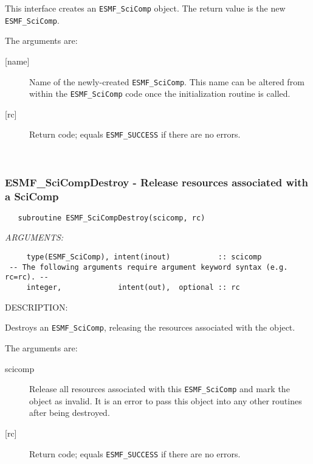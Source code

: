    This interface creates an {\tt ESMF\_SciComp} object. 
   The return value is the new {\tt ESMF\_SciComp}.
     
   The arguments are:
   \begin{description}
   \item[{[name]}]
     Name of the newly-created {\tt ESMF\_SciComp}.  This name can be altered
     from within the {\tt ESMF\_SciComp} code once the initialization routine
     is called.
   \item[{[rc]}]
     Return code; equals {\tt ESMF\_SUCCESS} if there are no errors.
   \end{description}
   
 
\mbox{}\hrulefill\ 
 
\subsubsection [ESMF\_SciCompDestroy] {ESMF\_SciCompDestroy - Release resources associated with a SciComp}


  
\begin{verbatim}   subroutine ESMF_SciCompDestroy(scicomp, rc)\end{verbatim}{\em ARGUMENTS:}
\begin{verbatim}     type(ESMF_SciComp), intent(inout)           :: scicomp
 -- The following arguments require argument keyword syntax (e.g. rc=rc). --
     integer,             intent(out),  optional :: rc\end{verbatim}
{\sf DESCRIPTION:\\ }


   Destroys an {\tt ESMF\_SciComp}, releasing the resources associated
   with the object.
  
   The arguments are:
   \begin{description}
   \item[scicomp]
     Release all resources associated with this {\tt ESMF\_SciComp}
     and mark the object as invalid.  It is an error to pass this
     object into any other routines after being destroyed.
   \item[{[rc]}]
     Return code; equals {\tt ESMF\_SUCCESS} if there are no errors.
   \end{description}
   
 
